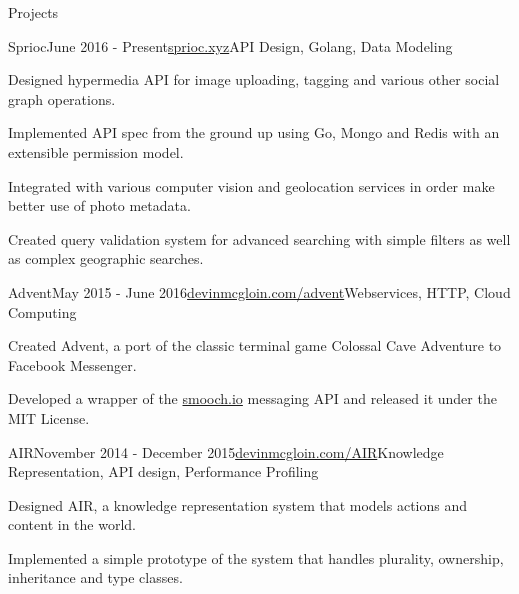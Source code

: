 \documentclass{resume} %
\begin{document}
\begin{rSection}{Projects}


\begin{rSubsection}{Sprioc}{June 2016 - Present}{\href{https://sprioc.xyz}{sprioc.xyz}}{API Design, Golang, Data Modeling}
\item Designed hypermedia API for image uploading, tagging and various other social graph operations.
\item Implemented API spec from the ground up using Go, Mongo and Redis with an extensible permission model.
\item Integrated with various computer vision and geolocation services in order make better use of photo metadata.
\item Created query validation system for advanced searching with simple filters as well as complex geographic searches.
\end{rSubsection}


\begin{rSubsection}{Advent}{May 2015 - June 2016}{\href{https://devinmcgloin.com/advent}{devinmcgloin.com/advent}}{Webservices, HTTP, Cloud Computing}
\item Created Advent, a port of the classic terminal game Colossal Cave Adventure to Facebook Messenger.
\item Developed a wrapper of the \href{https://smooch.io}{smooch.io} messaging API and released it under the MIT License.
\end{rSubsection}


\begin{rSubsection}{AIR}{November 2014 - December 2015}{\href{https://devinmcgloin.com/AIR}{devinmcgloin.com/AIR}}{Knowledge Representation, API design, Performance Profiling}
\item Designed AIR, a knowledge representation system that models actions and content in the world.
\item Implemented a simple prototype of the system that handles plurality, ownership, inheritance and type classes.
\end{rSubsection}
\end{rSection}

\end{document}
